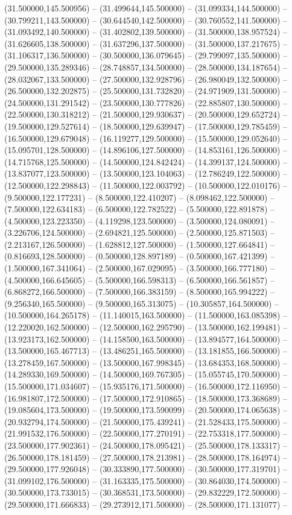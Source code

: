 (31.500000,145.500956) -- (31.499644,145.500000) -- (31.099334,144.500000) -- (30.799211,143.500000) -- (30.644540,142.500000) -- (30.760552,141.500000) -- (31.093492,140.500000) -- (31.402802,139.500000) -- (31.500000,138.957524) -- (31.626605,138.500000) -- (31.637296,137.500000) -- (31.500000,137.217675) -- (31.106317,136.500000) -- (30.500000,136.079645) -- (29.799097,135.500000) -- (29.500000,135.289346) -- (28.748857,134.500000) -- (28.500000,134.187654) -- (28.032067,133.500000) -- (27.500000,132.928796) -- (26.980049,132.500000) -- (26.500000,132.202875) -- (25.500000,131.732820) -- (24.971909,131.500000) -- (24.500000,131.291542) -- (23.500000,130.777826) -- (22.885807,130.500000) -- (22.500000,130.318212) -- (21.500000,129.930637) -- (20.500000,129.652724) -- (19.500000,129.527614) -- (18.500000,129.639947) -- (17.500000,129.785459) -- (16.500000,129.679048) -- (16.119277,129.500000) -- (15.500000,129.052640) -- (15.095701,128.500000) -- (14.896106,127.500000) -- (14.853161,126.500000) -- (14.715768,125.500000) -- (14.500000,124.842424) -- (14.399137,124.500000) -- (13.837077,123.500000) -- (13.500000,123.104063) -- (12.786249,122.500000) -- (12.500000,122.298843) -- (11.500000,122.003792) -- (10.500000,122.010176) -- (9.500000,122.177231) -- (8.500000,122.410207) -- (8.098462,122.500000) -- (7.500000,122.634183) -- (6.500000,122.782522) -- (5.500000,122.891878) -- (4.500000,123.223350) -- (4.119298,123.500000) -- (3.500000,124.080091) -- (3.226706,124.500000) -- (2.694821,125.500000) -- (2.500000,125.871503) -- (2.213167,126.500000) -- (1.628812,127.500000) -- (1.500000,127.664841) -- (0.816693,128.500000) -- (0.500000,128.897189) -- (0.500000,167.421399) -- (1.500000,167.341064) -- (2.500000,167.029095) -- (3.500000,166.777180) -- (4.500000,166.645605) -- (5.500000,166.598313) -- (6.500000,166.561857) -- (6.868272,166.500000) -- (7.500000,166.383159) -- (8.500000,165.994222) -- (9.256340,165.500000) -- (9.500000,165.313075) -- (10.305857,164.500000) -- (10.500000,164.265178) -- (11.140015,163.500000) -- (11.500000,163.085398) -- (12.220020,162.500000) -- (12.500000,162.295790) -- (13.500000,162.199481) -- (13.923173,162.500000) -- (14.158500,163.500000) -- (13.894577,164.500000) -- (13.500000,165.467713) -- (13.486251,165.500000) -- (13.181855,166.500000) -- (13.278459,167.500000) -- (13.500000,167.998345) -- (13.684353,168.500000) -- (14.289330,169.500000) -- (14.500000,169.767305) -- (15.055745,170.500000) -- (15.500000,171.034607) -- (15.935176,171.500000) -- (16.500000,172.116950) -- (16.981807,172.500000) -- (17.500000,172.910865) -- (18.500000,173.368689) -- (19.085604,173.500000) -- (19.500000,173.590099) -- (20.500000,174.065638) -- (20.932794,174.500000) -- (21.500000,175.439241) -- (21.528433,175.500000) -- (21.991532,176.500000) -- (22.500000,177.270191) -- (22.753318,177.500000) -- (23.500000,177.902361) -- (24.500000,178.095421) -- (25.500000,178.133317) -- (26.500000,178.181459) -- (27.500000,178.213981) -- (28.500000,178.164974) -- (29.500000,177.926048) -- (30.333890,177.500000) -- (30.500000,177.319701) -- (31.099102,176.500000) -- (31.163335,175.500000) -- (30.864030,174.500000) -- (30.500000,173.733015) -- (30.368531,173.500000) -- (29.832229,172.500000) -- (29.500000,171.666833) -- (29.273912,171.500000) -- (28.500000,171.131077) -- 